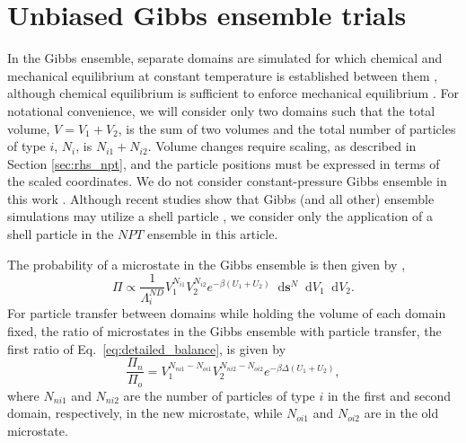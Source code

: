 \documentclass[
  9pt,
  bestpractices,
]{livecoms}
\newcommand*\diff{\mathop{}\!\mathrm{d}}
\begin{document}
\begin{figure}

\end{figure}

\section{\label{sec:rhs_gibbs}Unbiased Gibbs ensemble trials}

In the Gibbs ensemble, separate domains are simulated for which chemical and mechanical equilibrium at constant temperature is established between them \cite{panagiotopoulos_direct_1987}, although chemical equilibrium is sufficient to enforce mechanical equilibrium \cite{panagiotopoulos_adsorption_1987}.
For notational convenience, we will consider only two domains such that the total volume, $V=V_1+V_2$, is the sum of two volumes and the total number of particles of type $i$, $N_i$, is $N_{i1} + N_{i2}$.
Volume changes require scaling, as described in Section \ref{sec:rhs_npt}, and the particle positions must be expressed in terms of the scaled coordinates.
We do not consider constant-pressure Gibbs ensemble in this work \cite{panagiotopoulos_phase_1988}.
Although recent studies show that Gibbs (and all other) ensemble simulations may utilize a shell particle \cite{hatch_theory_2024}, we consider only the application of a shell particle in the $NPT$ ensemble in this article.

The probability of a microstate in the Gibbs ensemble is then given by \cite{panagiotopoulos_direct_1987, frenkel_understanding_2002, hatch_theory_2024},
\begin{equation}
\Pi \propto \frac{1}{\Lambda_i^{ND}}V_1^{N_{i1}}V_2^{N_{i2}} e^{-\beta (U_1+U_2)} \diff\mathbf{s}^{N} \diff V_1 \diff V_2.
\label{eq:rhs_gibbs_pi}
\end{equation}
For particle transfer between domains while holding the volume of each domain fixed, the ratio of microstates in the Gibbs ensemble with particle transfer, the first ratio of Eq.~\ref{eq:detailed_balance}, is given by
\begin{equation}
\frac{\Pi_{n}}{\Pi_{o}} = V_1^{N_{ni1}-N_{oi1}} V_2^{N_{ni2}-N_{oi2}}e^{-\beta\Delta (U_1+U_2)},
\label{eq:rhs_gibbs_particle}
\end{equation}
where $N_{ni1}$ and $N_{ni2}$ are the number of particles of type $i$ in the first and second domain, respectively, in the new microstate, while $N_{oi1}$ and $N_{oi2}$ are in the old microstate.
\end{document}
